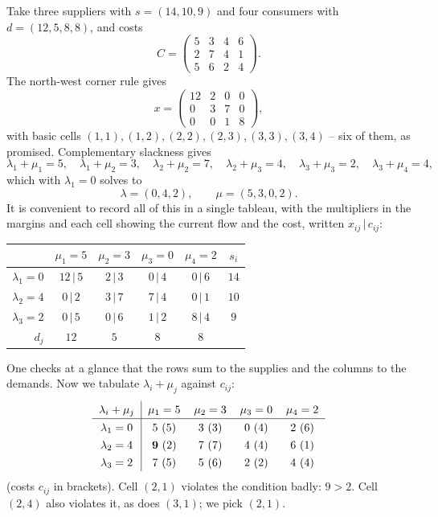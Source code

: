\documentclass[a4paper]{scrartcl}
\begin{document}
\begin{example}
    Take three suppliers with $s = (14, 10, 9)$ and four consumers with $d = (12,5,8,8)$, and costs
    $$
    C = \begin{pmatrix} 5 & 3 & 4 & 6\\ 2 & 7 & 4 & 1\\ 5 & 6 & 2 & 4\end{pmatrix}.
    $$
    The north-west corner rule gives
    $$
    x = \begin{pmatrix}12 & 2 & 0 & 0\\ 0 & 3 & 7 & 0\\0&0&1&8\end{pmatrix},
    $$
    with basic cells $(1,1),(1,2),(2,2),(2,3),(3,3),(3,4)$ -- six of them, as promised. Complementary slackness gives
    $$
    \lambda_1 + \mu_1 = 5,\quad \lambda_1 + \mu_2 = 3,\quad \lambda_2 + \mu_2 = 7,\quad \lambda_2 + \mu_3 = 4,\quad \lambda_3+\mu_3 = 2,\quad \lambda_3 + \mu_4 = 4,
    $$
    which with $\lambda_1 = 0$ solves to
    $$
    \lambda = (0, 4, 2), \qquad \mu = (5, 3, 0, 2).
    $$
    It is convenient to record all of this in a single tableau, with the multipliers in the margins and each cell showing the current flow and the cost, written $x_{ij}\,|\,c_{ij}$:
    \begin{center}
    \begin{tabular}{r|cccc|c}
        & $\mu_1 = 5$ & $\mu_2 = 3$ & $\mu_3 = 0$ & $\mu_4 = 2$ & $s_i$\\\hline
        $\lambda_1 = 0$ & $12\,|\,5$ & $2\,|\,3$ & $0\,|\,4$ & $0\,|\,6$ & $14$\\
        $\lambda_2 = 4$ & $0\,|\,2$ & $3\,|\,7$ & $7\,|\,4$ & $0\,|\,1$ & $10$\\
        $\lambda_3 = 2$ & $0\,|\,5$ & $0\,|\,6$ & $1\,|\,2$ & $8\,|\,4$ & $9$\\\hline
        $d_j$ & $12$ & $5$ & $8$ & $8$ &
    \end{tabular}
    \end{center}
    One checks at a glance that the rows sum to the supplies and the columns to the demands. Now we tabulate $\lambda_i + \mu_j$ against $c_{ij}$:
    $$
    \arraycolsep=6pt\def\arraystretch{1.3}
    \begin{array}{c|cccc}
        \lambda_i + \mu_j & \mu_1 = 5 & \mu_2 = 3 & \mu_3 = 0 & \mu_4 = 2\\\hline
        \lambda_1 = 0 & 5\ (5) & 3\ (3) & 0\ (4) & 2\ (6)\\
        \lambda_2 = 4 & \mathbf{9}\ (2) & 7\ (7) & 4\ (4) & 6\ (1)\\
        \lambda_3 = 2 & 7\ (5) & 5\ (6) & 2\ (2) & 4\ (4)
    \end{array}
    $$
    (costs $c_{ij}$ in brackets). Cell $(2,1)$ violates the condition badly: $9 > 2$. Cell $(2,4)$ also violates it, as does $(3,1)$; we pick $(2,1)$.


\end{example}
\end{document}
